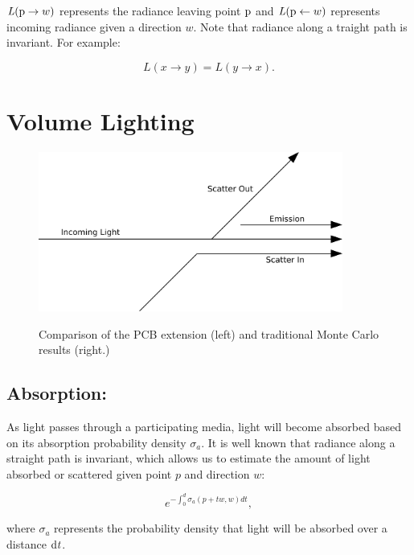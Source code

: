 \documentclass[12pt]{ucthesis}
\newcommand{\captionfonts}{\small\bf\ssp}
\begin{document}
$\mathit{L}(\textup{p} \to w)$ represents the radiance leaving point $\textup{p}$ and $\mathit{L}(\textup{p} \leftarrow w)$ represents incoming radiance given a direction $w$.  Note that radiance along a traight path is invariant.  For example:

\begin{equation}
L(x \to y) = L(y \to x).
\label{radianceinvariance}
\end{equation}

\section{Volume Lighting}

\begin{figure}[h!]
    \centering
    \includegraphics[width=100mm]{img/diag/vol_scatter.pdf}
    \captionfonts
    \caption{Comparison of the PCB extension (left) and traditional Monte Carlo results (right.)}
    \label{fig:vol_scat}
\end{figure}

\subsection{Absorption:}
As light passes through a participating media, light will become absorbed based on its absorption probability density $\sigma_{a}$. It is well known that radiance along a straight path is invariant, which allows us to estimate the amount of light absorbed or scattered given point $p$ and direction $w$:

\begin{equation}
e^{-\int_{0}^{d}\sigma_{a} (p+t\mathit{w},\mathit{w})d\mathit{t}},
\label{siga_eq}
\end{equation}

where $\sigma_{a}$ represents the probability density that light will be absorbed over a distance $\textup{d}\mathit{t}$.

\end{document}
